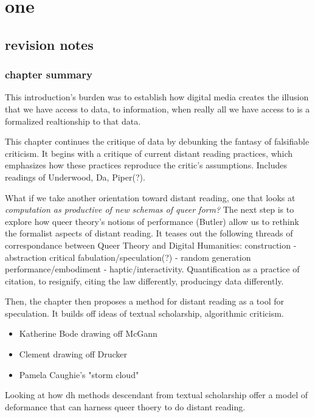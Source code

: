 \documentclass[11pt]{article}
\author{Filipa  Calado}
\date{\today}
\title{}
\begin{document}
\tableofcontents

\section{one}
\label{sec:org38baa7f}

\subsection{revision notes}
\label{sec:org32ce5ce}
\subsubsection{chapter summary}
\label{sec:org7360a65}
This introduction's burden was to establish how digital media creates
the illusion that we have access to data, to information, when really
all we have access to is a formalized realtionship to that data. 

This chapter continues the critique of data by debunking the fantasy
of falsifiable criticism. It begins with a critique of current distant
reading practices, which emphasizes how these practices reproduce the
critic's assumptions. Includes readings of Underwood, Da, Piper(?).

What if we take another orientation toward distant reading, one that
looks at \emph{computation as productive of new schemas of queer form?} The
next step is to explore how queer theory's notions of performance
(Butler) allow us to rethink the formalist aspects of distant
reading. It teases out the following threads of correspondance between
Queer Theory and Digital Humanities: construction - abstraction
critical fabulation/speculation(?) - random generation
performance/embodiment - haptic/interactivity. Quantification as a
practice of citation, to resignify, citing the law differently,
producingy data differently.

Then, the chapter then proposes a method for distant reading as a tool
for speculation. It builds off ideas of textual scholarship,
algorithmic criticism.
\begin{itemize}
\item Katherine Bode drawing off McGann
\item Clement drawing off Drucker
\item Pamela Caughie's "storm cloud"
\end{itemize}

Looking at how dh methods descendant from textual scholarship offer a
model of deformance that can harness queer thoery to do distant
reading.
\end{document}

